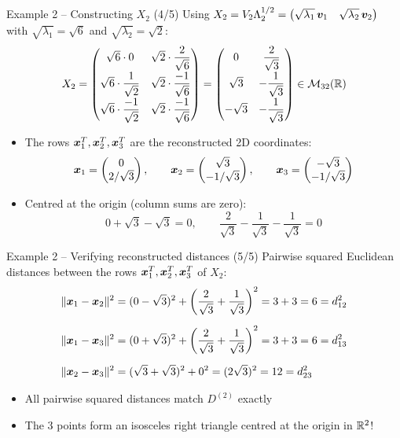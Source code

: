 \documentclass[aspectratio=169]{beamer}\usepackage[]{graphicx}\usepackage[]{xcolor}
\begin{document}
\begin{frame}{Example 2 -- Constructing $X_2$ (4/5)}
Using $X_2 = V_2 \Lambda_2^{1/2} = \begin{pmatrix} \sqrt{\lambda_1}\,\bm{v}_1 & \sqrt{\lambda_2}\,\bm{v}_2 \end{pmatrix}$ with $\sqrt{\lambda_1} = \sqrt{6}$ and $\sqrt{\lambda_2} = \sqrt{2}$:
\[
X_2 = \begin{pmatrix}
\sqrt{6} \cdot 0 & \sqrt{2}\cdot\dfrac{2}{\sqrt{6}} \\[0.25cm]
\sqrt{6} \cdot \dfrac{1}{\sqrt{2}} & \sqrt{2}\cdot\dfrac{-1}{\sqrt{6}} \\[0.25cm]
\sqrt{6} \cdot \dfrac{-1}{\sqrt{2}} & \sqrt{2}\cdot\dfrac{-1}{\sqrt{6}}
\end{pmatrix}
= \begin{pmatrix}
0 & \dfrac{2}{\sqrt{3}} \\[0.25cm]
\sqrt{3} & -\dfrac{1}{\sqrt{3}} \\[0.25cm]
-\sqrt{3} & -\dfrac{1}{\sqrt{3}}
\end{pmatrix} \in \mathcal{M}_{32}(\mathbb{R})
\]
\vfill
\begin{itemize}
\item The rows $\bm{x}_1^T, \bm{x}_2^T, \bm{x}_3^T$ are the reconstructed 2D coordinates:
\[
\bm{x}_1 = \begin{pmatrix} 0 \\ 2/\sqrt{3} \end{pmatrix}, \qquad
\bm{x}_2 = \begin{pmatrix} \sqrt{3} \\ -1/\sqrt{3} \end{pmatrix}, \qquad
\bm{x}_3 = \begin{pmatrix} -\sqrt{3} \\ -1/\sqrt{3} \end{pmatrix}
\]
\item Centred at the origin (column sums are zero):
\[
0 + \sqrt{3} - \sqrt{3} = 0, \qquad \frac{2}{\sqrt{3}} - \frac{1}{\sqrt{3}} - \frac{1}{\sqrt{3}} = 0
\]
\end{itemize}
\end{frame}

\begin{frame}{Example 2 -- Verifying reconstructed distances (5/5)}
Pairwise squared Euclidean distances between the rows $\bm{x}_1^T, \bm{x}_2^T, \bm{x}_3^T$ of $X_2$:
\vfill
\begin{align*}
\|\bm{x}_1 - \bm{x}_2\|^2 &= (0 - \sqrt{3})^2 + \left(\frac{2}{\sqrt{3}} + \frac{1}{\sqrt{3}}\right)^2 = 3 + 3 = 6 = d_{12}^2 \\[0.2cm]
\|\bm{x}_1 - \bm{x}_3\|^2 &= (0 + \sqrt{3})^2 + \left(\frac{2}{\sqrt{3}} + \frac{1}{\sqrt{3}}\right)^2 = 3 + 3 = 6 = d_{13}^2 \\[0.2cm]
\|\bm{x}_2 - \bm{x}_3\|^2 &= (\sqrt{3} + \sqrt{3})^2 + 0^2 = (2\sqrt{3})^2 = 12 = d_{23}^2
\end{align*}
\vfill
\begin{itemize}
\item All pairwise squared distances match $D^{(2)}$ exactly
\item The $3$ points form an isosceles right triangle centred at the origin in $\mathbb{R}^2$!
\end{itemize}
\end{frame}
\end{document}

